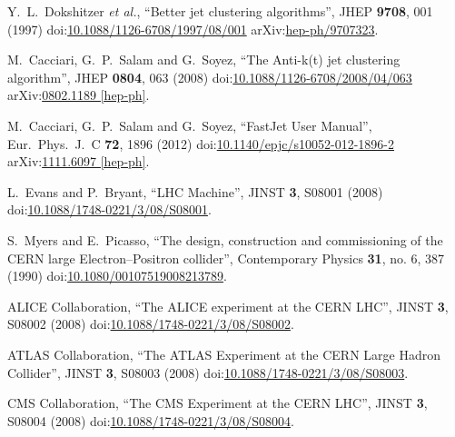 \begin{thebibliography}{99}
Y.~L.~Dokshitzer {\it et al.}, ``Better jet clustering algorithms'', JHEP {\bf 9708}, 001 (1997) doi:\href{http://dx.doi.org/10.1088/1126-6708/1997/08/001}{10.1088/1126-6708/1997/08/001} arXiv:\href{http://arxiv.org/abs/hep-ph/9707323}{hep-ph/9707323}.

M.~Cacciari, G.~P.~Salam and G.~Soyez, ``The Anti-k(t) jet clustering algorithm'', JHEP {\bf 0804}, 063 (2008) doi:\href{http://dx.doi.org/10.1088/1126-6708/2008/04/063}{10.1088/1126-6708/2008/04/063} arXiv:\href{http://arxiv.org/abs/arXiv:0802.1189}{0802.1189 [hep-ph]}.

M.~Cacciari, G.~P.~Salam and G.~Soyez, ``FastJet User Manual'', Eur.\ Phys.\ J.\ C {\bf 72}, 1896 (2012) doi:\href{http://dx.doi.org/10.1140/epjc/s10052-012-1896-2}{10.1140/epjc/s10052-012-1896-2} arXiv:\href{http://arxiv.org/abs/arXiv:1111.6097}{1111.6097 [hep-ph]}.






L.~Evans and P.~Bryant, ``LHC Machine'', JINST {\bf 3}, S08001 (2008) doi:\href{http://dx.doi.org/10.1088/1748-0221/3/08/S08001}{10.1088/1748-0221/3/08/S08001}.

S.~Myers and E.~Picasso, ``The design, construction and commissioning of the CERN large Electron–Positron collider'', Contemporary Physics {\bf 31}, no. 6, 387 (1990) doi:\href{https://doi.org/10.1080/00107519008213789}{10.1080/00107519008213789}.

ALICE Collaboration, ``The ALICE experiment at the CERN LHC'', JINST {\bf 3}, S08002 (2008) doi:\href{http://dx.doi.org/10.1088/1748-0221/3/08/S08002}{10.1088/1748-0221/3/08/S08002}.

ATLAS Collaboration, ``The ATLAS Experiment at the CERN Large Hadron Collider'', JINST {\bf 3}, S08003 (2008) doi:\href{http://dx.doi.org/10.1088/1748-0221/3/08/S08003}{10.1088/1748-0221/3/08/S08003}.

CMS Collaboration, ``The CMS Experiment at the CERN LHC'', JINST {\bf 3}, S08004 (2008) doi:\href{http://dx.doi.org/10.1088/1748-0221/3/08/S08004}{10.1088/1748-0221/3/08/S08004}.


\end{thebibliography}
